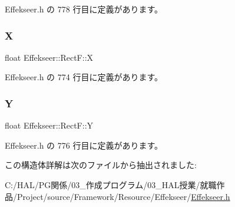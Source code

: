  Effekseer.\+h の 778 行目に定義があります。

\mbox{\label{struct_effekseer_1_1_rect_f_ae059c8a9c7b7df7675aa77add61de01f}} 
\subsubsection{\texorpdfstring{X}{X}}
{\footnotesize\ttfamily float Effekseer\+::\+Rect\+F\+::X}



 Effekseer.\+h の 774 行目に定義があります。

\mbox{\label{struct_effekseer_1_1_rect_f_ac019b5783fec33a61954817f04ead8f0}} 
\subsubsection{\texorpdfstring{Y}{Y}}
{\footnotesize\ttfamily float Effekseer\+::\+Rect\+F\+::Y}



 Effekseer.\+h の 776 行目に定義があります。



この構造体詳解は次のファイルから抽出されました\+:\begin{DoxyCompactItemize}
\item 
C\+:/\+H\+A\+L/\+P\+G関係/03\+\_\+作成プログラム/03\+\_\+\+H\+A\+L授業/就職作品/\+Project/source/\+Framework/\+Resource/\+Effekseer/\mbox{\hyperlink{_effekseer_8h}{Effekseer.\+h}}\end{DoxyCompactItemize}
